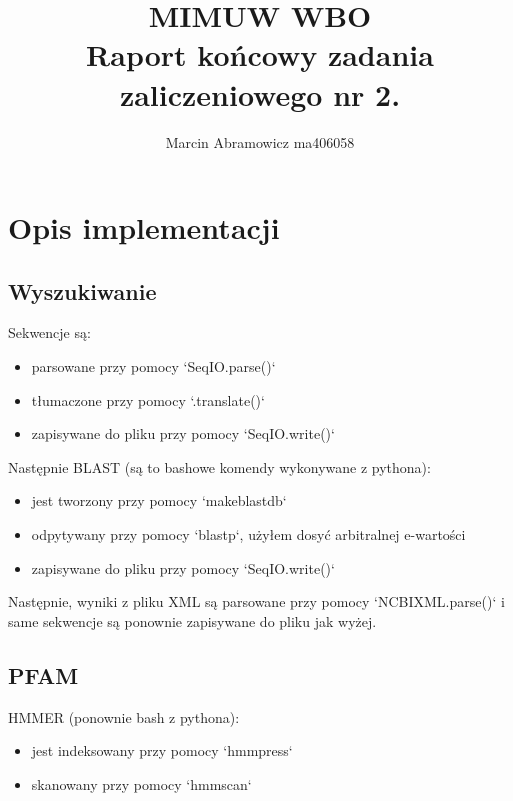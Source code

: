 \documentclass{article}
\title{MIMUW WBO \\ Raport końcowy zadania zaliczeniowego nr 2.}
\author{Marcin Abramowicz ma406058}
\begin{document}
    \maketitle

    \section{Opis implementacji}

        \subsection{Wyszukiwanie}

            Sekwencje są:
            \begin{itemize}
                \item
                    parsowane przy pomocy `SeqIO.parse()`

                \item
                    tłumaczone przy pomocy `.translate()`

                \item
                    zapisywane do pliku przy pomocy `SeqIO.write()`

            \end{itemize}

            Następnie BLAST (są to bashowe komendy wykonywane z pythona):
            \begin{itemize}
                \item
                    jest tworzony przy pomocy `makeblastdb`

                \item
                    odpytywany przy pomocy `blastp`, użyłem dosyć arbitralnej e-wartości

                \item
                    zapisywane do pliku przy pomocy `SeqIO.write()`
            \end{itemize}

            Następnie, wyniki z pliku XML są parsowane przy pomocy `NCBIXML.parse()` i same sekwencje są ponownie zapisywane do pliku jak wyżej.


        \subsection{PFAM}

            HMMER (ponownie bash z pythona):
            \begin{itemize}
                \item
                    jest indeksowany przy pomocy `hmmpress`

                \item
                    skanowany przy pomocy `hmmscan`

            \end{itemize}
\end{document}
